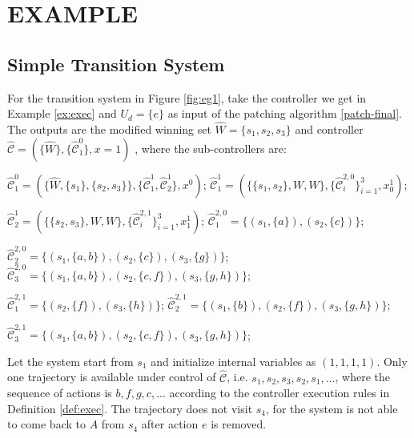 \section{EXAMPLE}
\label{sec:example}
\subsection{Simple Transition System}
\label{sec:example1}
For the transition system in Figure \ref{fig:eg1}, take the controller we get in Example \ref{ex:exec} and  $ U_d= \{e\} $ as input of the patching algorithm \eqref{patch-final}. The outputs are the modified winning set $ \widehat{W}=\{s_1,s_2,s_3\} $ and controller $ \widehat{\mathcal{C}} = (\{\widehat{W}\},\{\widehat{\mathcal{C}}_1^0\},x=1) $ , where the sub-controllers are: 

\noindent$ \widehat{\mathcal{C}}^0_1 = (\{\widehat{W},\{s_1\},\{s_2,s_3\}\},\{\widehat{\mathcal{C}}^1_1, \widehat{\mathcal{C}}^1_2\},x^0) $; $ \widehat{\mathcal{C}}^1_1 = (\{\{s_1,s_2\},W,W\},\{\widehat{\mathcal{C}}^{2,0}_i\}_{i=1}^3, x^1_0)$; 

\noindent$ \widehat{\mathcal{C}}^1_2 = (\{\{s_2,s_3\},W,W\},\{\widehat{\mathcal{C}}^{2,1}_i\}_{i=1}^{3}, x^1_1)$; $ \widehat{\mathcal{C}}^{2,0}_1 = \{(s_1,\{a\}),(s_2,\{c\})\} $;

\noindent$ \widehat{\mathcal{C}}^{2,0}_2 = \{(s_1,\{a,b\}),(s_2,\{c\}),(s_3,\{g\})\} $; $ \widehat{\mathcal{C}}^{2,0}_3 = \{(s_1,\{a,b\}),(s_2,\{c,f\}),(s_3,\{g,h\})\} $; 

\noindent$ \widehat{\mathcal{C}}^{2,1}_1 = \{(s_2,\{f\}),(s_3,\{h\})\} $; $ \widehat{\mathcal{C}}^{2,1}_2 = \{(s_1,\{b\}),(s_2,\{f\}), (s_3,\{g,h\})\} $;

\noindent$ \widehat{\mathcal{C}}^{2,1}_3 = \{(s_1,\{a,b\}),(s_2,\{c,f\}),(s_3,\{g,h\})\} $;


Let the system start from $ s_1 $ and initialize internal variables as $ (1,1,1,1) $. Only one trajectory is available under control of $\widehat{\mathcal{C}} $, i.e. $ s_1,s_2,s_3,s_2,s_1,...$, where the sequence of actions is $ b,f,g,c,... $ according to the controller execution rules in Definition \ref{def:exec}. The trajectory does not visit $ s_4 $, for the system is not able to come back to $ A $ from $ s_4 $ after action $ e $ is removed.

